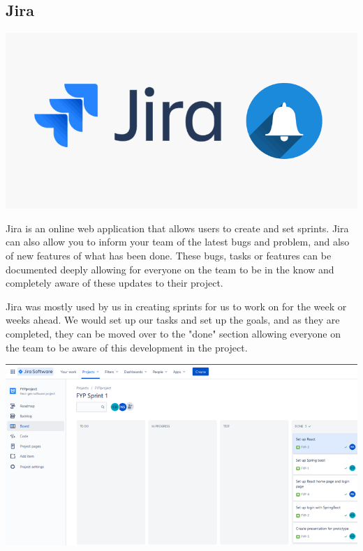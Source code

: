\subsection{Jira}
\includegraphics[scale=0.4]{img/jira.png}\par
Jira is an online web application that allows users to create and set sprints. Jira can also allow you to inform your team of the latest bugs and problem, and also of new features of what has been done. These bugs, tasks or features can be documented deeply allowing for everyone on the team to be in the know and completely aware of these updates to their project. \par
Jira was mostly used by us in creating sprints for us to work on for the week or weeks ahead. We would set up our tasks and set up the goals, and as they are completed, they can be moved over to the "done" section allowing everyone on the team to be aware of this development in the project. \par
\includegraphics[scale=0.7]{img/jira-sprint.PNG}\par

